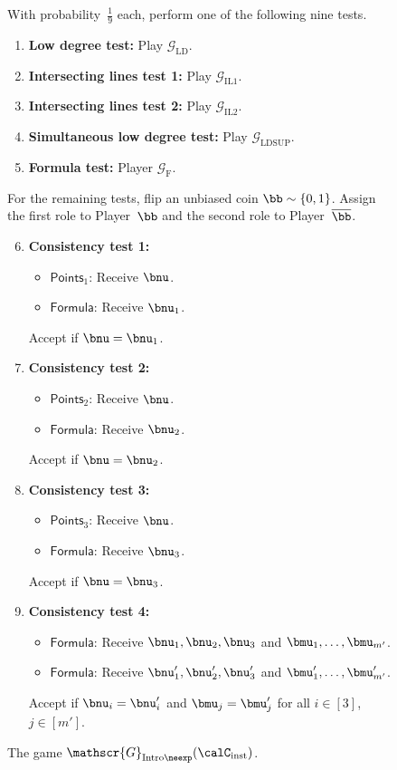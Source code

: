 \documentclass[11pt]{article}
\newcommand{\game}{\mathscr{G}}
\begin{document}
{
\begin{figure}
With probability~$\tfrac{1}{9}$ each, perform one of the following nine tests.
\begin{enumerate}
	\item \textbf{Low degree test:} Play $\game_{\mathrm{LD}}$.
	\item \textbf{Intersecting lines test 1:} Play $\game_{\mathrm{IL1}}$.
	\item \textbf{Intersecting lines test 2:} Play $\game_{\mathrm{IL2}}$.
	\item \textbf{Simultaneous low degree test:} Play $\game_{\mathrm{LDSUP}}$.
	\item \textbf{Formula test:} Player $\game_{\mathrm{F}}$.
\end{enumerate}
For the remaining tests, flip an unbiased coin $\bb \sim \{0, 1\}$.
Assign the first role to Player~$\bb$ and the second role to Player~$\overline{\bb}$.
\begin{enumerate}
\setcounter{enumi}{5}
	\item \textbf{Consistency test 1:} 
		\begin{itemize}
		\item[$\circ$] $\mathsf{Points}_1$: Receive $\bnu$.
		\item[$\circ$] $\mathsf{Formula}$: Receive $\bnu_1$.
		\end{itemize}
		Accept if $\bnu = \bnu_1$.
	\item \textbf{Consistency test 2:} 
		\begin{itemize}
		\item[$\circ$] $\mathsf{Points}_2$: Receive $\bnu$.
		\item[$\circ$] $\mathsf{Formula}$: Receive $\bnu_2$.
		\end{itemize}
		Accept if $\bnu = \bnu_2$.
	\item \textbf{Consistency test 3:} 
		\begin{itemize}
		\item[$\circ$] $\mathsf{Points}_3$: Receive $\bnu$.
		\item[$\circ$] $\mathsf{Formula}$: Receive $\bnu_3$.
		\end{itemize}
		Accept if $\bnu = \bnu_3$.
	\item \textbf{Consistency test 4:} 
		\begin{itemize}
		\item[$\circ$] $\mathsf{Formula}$: Receive $\bnu_1, \bnu_2, \bnu_3$ and $\bmu_1, \ldots, \bmu_{m'}$.
		\item[$\circ$] $\mathsf{Formula}$: Receive $\bnu_1', \bnu_2', \bnu_3'$ and $\bmu_1', \ldots, \bmu_{m'}'$.
		\end{itemize}
		Accept if $\bnu_i = \bnu_i'$ and $\bmu_j = \bmu_j'$ for all $i \in [3]$, $j \in [m']$.
	\end{enumerate}
	\caption{The game $\game_{\mathrm{Intro}\neexp}(\calC_{\mathrm{inst}})$.\label{fig:big-neexp}}
\end{figure}
}
\end{document}
